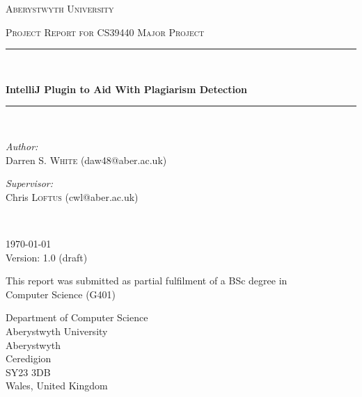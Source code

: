 
\begin{titlepage}
  \begin{center}
    \vspace*{.06\textheight}
    {\scshape\LARGE Aberystwyth University\par}\vspace{1.5cm}
    \textsc{\Large Project Report for CS39440 Major Project}\\[0.5cm]

    \rule{.9\linewidth}{.6pt} \\[0.4cm]
    {\huge \bfseries IntelliJ Plugin to Aid With Plagiarism Detection\par}\vspace{0.4cm}
    \rule{.9\linewidth}{.6pt} \\[1.5cm]

    \begin{minipage}[t]{0.4\textwidth}
    \begin{flushleft} \large
    \emph{Author:}\\
    Darren S. \textsc{White} (daw48@aber.ac.uk)
    \end{flushleft}
    \end{minipage}
    \begin{minipage}[t]{0.4\textwidth}
    \begin{flushright} \large
    \emph{Supervisor:} \\
    Chris \textsc{Loftus} (cwl@aber.ac.uk)
    \end{flushright}
    \end{minipage}\\[1cm]

    \vfill

    \large \today\\[0.3cm]
    Version: 1.0 (draft)\\[1cm]

    \vfill

    \large This report was submitted as partial fulfilment of a BSc degree in\\[0.3cm]
    Computer Science (G401)\\[2cm]

    \vfill

    \begin{minipage}[t]{\textwidth}
    \begin{flushleft} \large
    Department of Computer Science\\
    Aberystwyth University\\
    Aberystwyth\\
    Ceredigion\\
    SY23 3DB\\
    Wales, United Kingdom\\
    \end{flushleft}
    \end{minipage}

    \vfill
  \end{center}
\end{titlepage}


